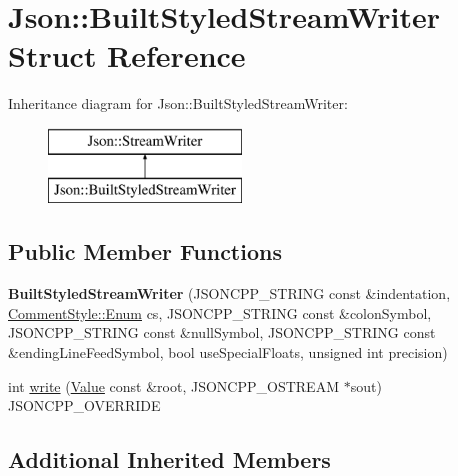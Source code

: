 \hypertarget{structJson_1_1BuiltStyledStreamWriter}{}\section{Json\+:\+:Built\+Styled\+Stream\+Writer Struct Reference}
\label{structJson_1_1BuiltStyledStreamWriter}
Inheritance diagram for Json\+:\+:Built\+Styled\+Stream\+Writer\+:\begin{figure}[H]
\begin{center}
\leavevmode
\includegraphics[height=2.000000cm]{structJson_1_1BuiltStyledStreamWriter}
\end{center}
\end{figure}
\subsection*{Public Member Functions}
\begin{DoxyCompactItemize}
\item 
\mbox{\label{structJson_1_1BuiltStyledStreamWriter_adf11b7d1ee3c68d096b7c662ee85948e}} 
{\bfseries Built\+Styled\+Stream\+Writer} (J\+S\+O\+N\+C\+P\+P\+\_\+\+S\+T\+R\+I\+NG const \&indentation, \hyperlink{structJson_1_1CommentStyle_a51fc08f3518fd81eba12f340d19a3d0c}{Comment\+Style\+::\+Enum} cs, J\+S\+O\+N\+C\+P\+P\+\_\+\+S\+T\+R\+I\+NG const \&colon\+Symbol, J\+S\+O\+N\+C\+P\+P\+\_\+\+S\+T\+R\+I\+NG const \&null\+Symbol, J\+S\+O\+N\+C\+P\+P\+\_\+\+S\+T\+R\+I\+NG const \&ending\+Line\+Feed\+Symbol, bool use\+Special\+Floats, unsigned int precision)
\item 
int \hyperlink{structJson_1_1BuiltStyledStreamWriter_a823cdb1afabb6b0d5f39bcd5a6a6f747}{write} (\hyperlink{classJson_1_1Value}{Value} const \&root, J\+S\+O\+N\+C\+P\+P\+\_\+\+O\+S\+T\+R\+E\+AM $\ast$sout) J\+S\+O\+N\+C\+P\+P\+\_\+\+O\+V\+E\+R\+R\+I\+DE
\end{DoxyCompactItemize}
\subsection*{Additional Inherited Members}



